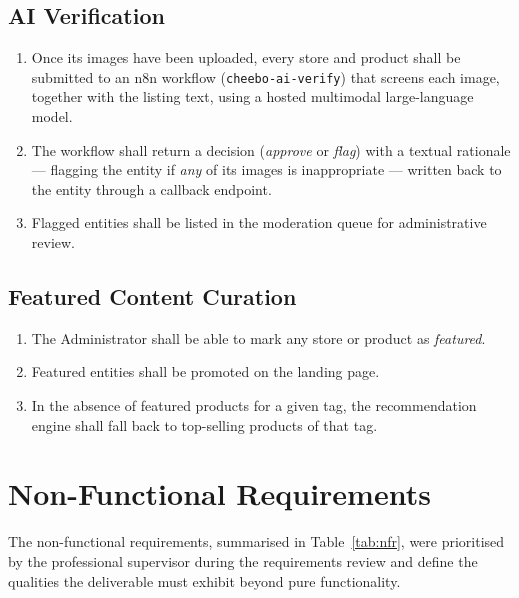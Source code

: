 \documentclass[12pt, a4paper, oneside]{report}
\begin{document}
\subsection{AI Verification}

\begin{enumerate}[label=\textbf{FR-V\arabic*.},leftmargin=*,itemsep=2pt]
  \item Once its images have been uploaded, every store and product
        shall be submitted to an n8n workflow
        (\texttt{cheebo-ai-verify}) that screens each image, together
        with the listing text, using a hosted multimodal
        large-language model.
  \item The workflow shall return a decision (\textit{approve} or
        \textit{flag}) with a textual rationale --- flagging the
        entity if \emph{any} of its images is inappropriate --- written
        back to the entity through a callback endpoint.
  \item Flagged entities shall be listed in the moderation queue
        for administrative review.
\end{enumerate}

\subsection{Featured Content Curation}

\begin{enumerate}[label=\textbf{FR-C\arabic*.},leftmargin=*,itemsep=2pt]
  \item The Administrator shall be able to mark any store or product
        as \textit{featured}.
  \item Featured entities shall be promoted on the landing page.
  \item In the absence of featured products for a given tag, the
        recommendation engine shall fall back to top-selling
        products of that tag.
\end{enumerate}

\section{Non-Functional Requirements}

The non-functional requirements, summarised in
Table~\ref{tab:nfr}, were prioritised by the professional supervisor
during the requirements review and define the qualities the
deliverable must exhibit beyond pure functionality.
\end{document}
